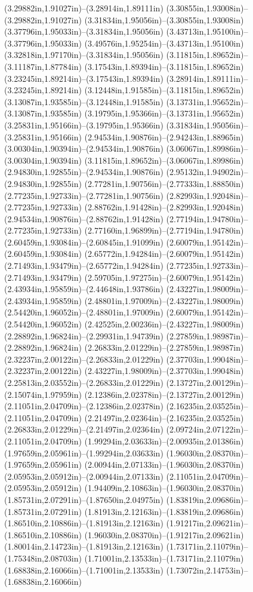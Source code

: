 (3.29882in,1.91027in)--(3.28914in,1.89111in) (3.30855in,1.93008in)--(3.29882in,1.91027in) (3.31834in,1.95056in)--(3.30855in,1.93008in) (3.37796in,1.95033in)--(3.31834in,1.95056in) (3.43713in,1.95100in)--(3.37796in,1.95033in) (3.49576in,1.95254in)--(3.43713in,1.95100in) (3.32818in,1.97170in)--(3.31834in,1.95056in) (3.11815in,1.89652in)--(3.11187in,1.87784in) (3.17543in,1.89394in)--(3.11815in,1.89652in) (3.23245in,1.89214in)--(3.17543in,1.89394in) (3.28914in,1.89111in)--(3.23245in,1.89214in) (3.12448in,1.91585in)--(3.11815in,1.89652in) (3.13087in,1.93585in)--(3.12448in,1.91585in) (3.13731in,1.95652in)--(3.13087in,1.93585in) (3.19795in,1.95366in)--(3.13731in,1.95652in) (3.25831in,1.95166in)--(3.19795in,1.95366in) (3.31834in,1.95056in)--(3.25831in,1.95166in) (2.94534in,1.90876in)--(2.94243in,1.88965in) (3.00304in,1.90394in)--(2.94534in,1.90876in) (3.06067in,1.89986in)--(3.00304in,1.90394in) (3.11815in,1.89652in)--(3.06067in,1.89986in) (2.94830in,1.92855in)--(2.94534in,1.90876in) (2.95132in,1.94902in)--(2.94830in,1.92855in) (2.77281in,1.90756in)--(2.77333in,1.88850in) (2.77235in,1.92733in)--(2.77281in,1.90756in) (2.82993in,1.92048in)--(2.77235in,1.92733in) (2.88762in,1.91428in)--(2.82993in,1.92048in) (2.94534in,1.90876in)--(2.88762in,1.91428in) (2.77194in,1.94780in)--(2.77235in,1.92733in) (2.77160in,1.96899in)--(2.77194in,1.94780in) (2.60459in,1.93084in)--(2.60845in,1.91099in) (2.60079in,1.95142in)--(2.60459in,1.93084in) (2.65772in,1.94284in)--(2.60079in,1.95142in) (2.71493in,1.93479in)--(2.65772in,1.94284in) (2.77235in,1.92733in)--(2.71493in,1.93479in) (2.59705in,1.97275in)--(2.60079in,1.95142in) (2.43934in,1.95859in)--(2.44648in,1.93786in) (2.43227in,1.98009in)--(2.43934in,1.95859in) (2.48801in,1.97009in)--(2.43227in,1.98009in) (2.54420in,1.96052in)--(2.48801in,1.97009in) (2.60079in,1.95142in)--(2.54420in,1.96052in) (2.42525in,2.00236in)--(2.43227in,1.98009in) (2.28892in,1.96824in)--(2.29931in,1.94739in) (2.27859in,1.98987in)--(2.28892in,1.96824in) (2.26833in,2.01229in)--(2.27859in,1.98987in) (2.32237in,2.00122in)--(2.26833in,2.01229in) (2.37703in,1.99048in)--(2.32237in,2.00122in) (2.43227in,1.98009in)--(2.37703in,1.99048in) (2.25813in,2.03552in)--(2.26833in,2.01229in) (2.13727in,2.00129in)--(2.15074in,1.97959in) (2.12386in,2.02378in)--(2.13727in,2.00129in) (2.11051in,2.04709in)--(2.12386in,2.02378in) (2.16235in,2.03525in)--(2.11051in,2.04709in) (2.21497in,2.02364in)--(2.16235in,2.03525in) (2.26833in,2.01229in)--(2.21497in,2.02364in) (2.09724in,2.07122in)--(2.11051in,2.04709in) (1.99294in,2.03633in)--(2.00935in,2.01386in) (1.97659in,2.05961in)--(1.99294in,2.03633in) (1.96030in,2.08370in)--(1.97659in,2.05961in) (2.00944in,2.07133in)--(1.96030in,2.08370in) (2.05953in,2.05912in)--(2.00944in,2.07133in) (2.11051in,2.04709in)--(2.05953in,2.05912in) (1.94409in,2.10863in)--(1.96030in,2.08370in) (1.85731in,2.07291in)--(1.87650in,2.04975in) (1.83819in,2.09686in)--(1.85731in,2.07291in) (1.81913in,2.12163in)--(1.83819in,2.09686in) (1.86510in,2.10886in)--(1.81913in,2.12163in) (1.91217in,2.09621in)--(1.86510in,2.10886in) (1.96030in,2.08370in)--(1.91217in,2.09621in) (1.80014in,2.14723in)--(1.81913in,2.12163in) (1.73171in,2.11079in)--(1.75348in,2.08703in) (1.71001in,2.13533in)--(1.73171in,2.11079in) (1.68838in,2.16066in)--(1.71001in,2.13533in) (1.73072in,2.14753in)--(1.68838in,2.16066in) 
